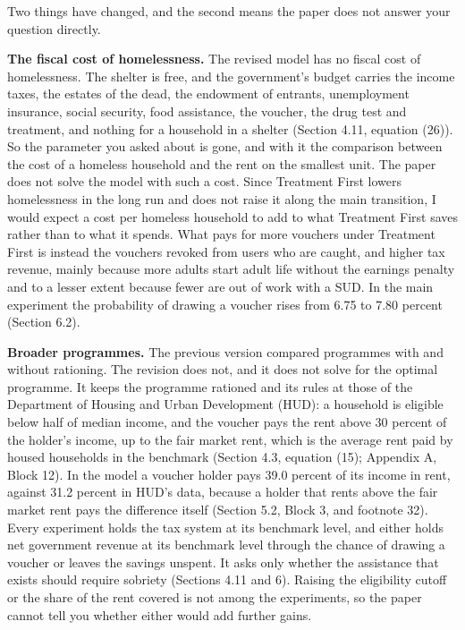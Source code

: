 \documentclass[11pt]{article}
\begin{document}
\begin{response}
\open Two things have changed, and the second means the paper does not answer your
question directly.

\textbf{The fiscal cost of homelessness.} The revised model has no fiscal cost of
homelessness. The shelter is free, and the government's budget carries the income taxes,
the estates of the dead, the endowment of entrants, unemployment insurance, social
security, food assistance, the voucher, the drug test and treatment, and nothing for a
household in a shelter (Section 4.11, equation (26)). So the parameter you asked about is
gone, and with it the comparison between the cost of a homeless household and the rent on
the smallest unit. The paper does not solve the model with such a cost. Since Treatment
First lowers homelessness in the long run and does not raise it along the main transition,
I would expect a cost per homeless household to add to what Treatment First saves rather
than to what it spends. What pays for more vouchers under Treatment First is instead the
vouchers revoked from users who are caught, and higher tax revenue, mainly because more
adults start adult life without the earnings penalty and to a lesser extent because fewer
are out of work with a SUD. In the main experiment the probability of drawing a voucher
rises from 6.75 to 7.80 percent (Section 6.2).

\textbf{Broader programmes.} The previous version compared programmes with and without
rationing. The revision does not, and it does not solve for the optimal programme. It keeps
the programme rationed and its rules at those of the Department of Housing and Urban
Development (HUD): a household is eligible below half of median income, and the voucher
pays the rent above 30 percent of the holder's income, up to the fair market rent, which is
the average rent paid by housed households in the benchmark (Section 4.3, equation (15);
Appendix A, Block 12). In the model a voucher holder pays 39.0 percent of its income in
rent, against 31.2 percent in HUD's data, because a holder that rents above the fair market
rent pays the difference itself (Section 5.2, Block 3, and footnote 32). Every experiment
holds the tax system at its benchmark level, and either holds net government revenue at its
benchmark level through the chance of drawing a voucher or leaves the savings unspent. It
asks only whether the assistance that exists should require sobriety (Sections 4.11 and 6).
Raising the eligibility cutoff or the share of the rent covered is not among the
experiments, so the paper cannot tell you whether either would add further gains.


\end{response}
\end{document}
